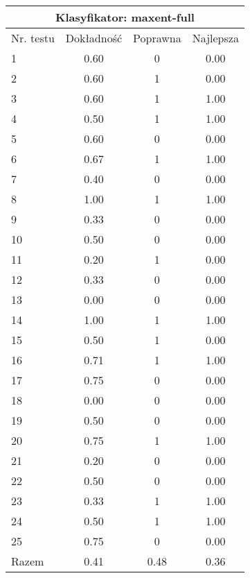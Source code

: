 \begin{tabular}{|l|c|c|c|}
\hline
\multicolumn{4}{|c|}{Klasyfikator: maxent-full}\\
\hline
Nr. testu & Dokładność & Poprawna & Najlepsza\\
\hline
1 & 0.60 & 0 & 0.00 \\
2 & 0.60 & 1 & 0.00 \\
3 & 0.60 & 1 & 1.00 \\
4 & 0.50 & 1 & 1.00 \\
5 & 0.60 & 0 & 0.00 \\
6 & 0.67 & 1 & 1.00 \\
7 & 0.40 & 0 & 0.00 \\
8 & 1.00 & 1 & 1.00 \\
9 & 0.33 & 0 & 0.00 \\
10 & 0.50 & 0 & 0.00 \\
11 & 0.20 & 1 & 0.00 \\
12 & 0.33 & 0 & 0.00 \\
13 & 0.00 & 0 & 0.00 \\
14 & 1.00 & 1 & 1.00 \\
15 & 0.50 & 1 & 0.00 \\
16 & 0.71 & 1 & 1.00 \\
17 & 0.75 & 0 & 0.00 \\
18 & 0.00 & 0 & 0.00 \\
19 & 0.50 & 0 & 0.00 \\
20 & 0.75 & 1 & 1.00 \\
21 & 0.20 & 0 & 0.00 \\
22 & 0.50 & 0 & 0.00 \\
23 & 0.33 & 1 & 1.00 \\
24 & 0.50 & 1 & 1.00 \\
25 & 0.75 & 0 & 0.00 \\
\hline
Razem & 0.41 & 0.48 & 0.36 \\
\hline
\end{tabular}
